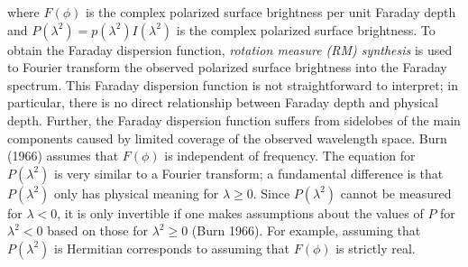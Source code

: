 \documentclass[a4paper,10pt]{article}
\begin{document}
{\noindent}where $F(\phi)$ is the complex polarized surface brightness per unit Faraday depth and $P(\lambda^2) = p(\lambda^2)I(\lambda^2)$ is the complex polarized surface brightness. To obtain the Faraday dispersion function, \textit{rotation measure (RM) synthesis} is used to Fourier transform the observed polarized surface brightness into the Faraday spectrum. This Faraday dispersion function is not straightforward to interpret; in particular, there is no direct relationship between Faraday depth and physical depth. Further, the Faraday dispersion function suffers from sidelobes of the main components caused by limited coverage of the observed wavelength space. Burn (1966) assumes that $F(\phi)$ is independent of frequency. The equation for $P(\lambda^2)$ is very similar to a Fourier transform; a fundamental difference is that $P(\lambda^2)$ only has physical meaning for $\lambda\geq0$. Since $P(\lambda^2)$ cannot be measured for $\lambda<0$, it is only invertible if one makes assumptions about the values of $P$ for $\lambda^2<0$ based on those for $\lambda^2\geq0$ (Burn 1966). For example, assuming that $P(\lambda^2)$ is Hermitian corresponds to assuming that $F(\phi)$ is strictly real.
\end{document}
